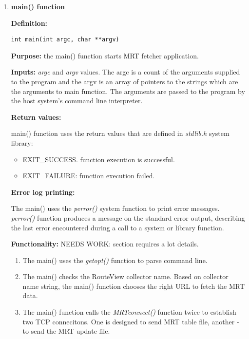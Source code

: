  

\begin{enumerate}

\item{\textbf{main() function} }

\textbf{Definition:}  
\begin{verbatim}
int main(int argc, char **argv)
\end{verbatim}

\textbf{Purpose:} the main() function starts MRT fetcher application. 

\textbf{Inputs:} \emph{argc} and \emph{argv} values. The argc is a count of the arguments supplied to the program and the argv is an array of pointers to the strings which are the arguments to main function. The arguments are passed to the program by the host system's command line interpreter. 

\textbf{Return values:}

main() function uses the return values that are defined in \emph{stdlib.h} system library:
\begin{itemize}
\item{EXIT\_SUCCESS. function execution is  successful. }
\item{EXIT\_FAILURE: function execution failed.}
\end{itemize} 

\textbf{Error log printing:}

The main() uses the \emph{perror()} system function to print error messages. \emph{perror()} function produces a message on the standard error output, describing the last error encountered during a call to a system or library function.

\textbf{Functionality:}
NEEDS WORK: section requires a lot details.
\begin{enumerate}



\item{The main() uses the \emph{getopt()} function to parse command line. }

\item{The main() checks the RouteView collector name. Based on collector name string, the main() function chooses the right URL to fetch the MRT data.  }

\item{The main() function calls the \emph{MRTconnect()} function twice to establish two TCP connecitons. One is designed to send MRT table file, another - to send the MRT update file.}


\end{enumerate}
\end{enumerate}
